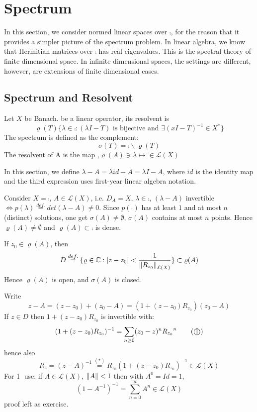 \newpage

\section{Spectrum}
In this section, we consider normed linear spaces over $\comp$, for the reason that it provides a simpler picture of the spectrum problem. In linear algebra, we know that Hermitian matrices over $\comp$ has real eigenvalues. This is the spectral theory of finite dimensional space. In infinite dimensional spaces, the settings are different, however, are extensions of finite dimensional cases.
\subsection{Spectrum and Resolvent}
\begin{definition}\nl
	Let $X$ be Banach.  be a linear operator, its resolvent is
	$$
		\varrho({T})
		\{
		\lambda\in\comp:(\lambda I-T) \text{ is bijective and } \exists (xI-T)^{-1}\in X^*
		\}
	$$
	The spectrum is defined as the complement:
	$$
		\sigma(T)=\comp\backslash\varrho(T)
	$$
	The {\underline{resolvent}} of A is the map ,$\varrho(A)\ni\lambda\mapsto \in\mathcal{L}(X)$
\end{definition}

\begin{remark}\nl
	In this section, we define $\lambda-A=\lambda id -A=\lambda I-A$, where $id$ is the identity map and the third expression uses first-year linear algebra notation.
\end{remark}

\begin{example}
	Consider $X=\comp$, $A\in \mathcal{L}(X)$, i.e. $D_A=X$, $\lambda\in\comp$, $(\lambda-A)$ invertible $\iff p(\lambda)\stackrel{def.}{=}det(\lambda-A)\neq0$. Since  $p(\cdot)$ has at least $1$ and at most $n$ (distinct) solutions, one get $\sigma(A)\neq \emptyset$, $\sigma(A)$ contains at most $n$ points. Hence $\varrho(A)\neq\emptyset$ and $\varrho(A)\subset\comp$ is dense.
\end{example}

\begin{lemma}\nl
	If $z_0\in\varrho(A)$, then
	$$D\stackrel{def.}{=}
		\{
		\varrho\in\mathbb{C}:|z-z_0|<\frac{1}{\left\|{R_{z_0}}\right\|_{\mathcal{L}(X)}}
		\}
		\subset\varrho(A)$$
	Hence $\varrho(A)$ is open, and $\sigma(A)$ is closed.
	\begin{pf}{}{}
		Write 
		$$
		z-A=
		( z-z_0)+(z_0-A)=(1+(z-z_0)R_{z_0})(z_0-A)
		$$
		If $z\in D$ then $1+(z-z_0)R_{z_0}$ is invertible with:
		\[
		(1+(z-z_0)R_{z_0})^{-1}=\sum_{n\geq0}(z_0-z)^n {R_{z_0}}^n\tag{\textcircled{1}}
		\]
		hence also
		$$
		R_z=(z-A)^{-1}\stackrel{(*)}{=}R_{z_0}(1+(z-z_0)R_{z_0})^{-1}\in\mathcal{L}(X)
		$$
		For \textcircled{1} use: if $A\in\mathcal{L}(X)$, $\left\|{A}\right\|<1$ then with $A^0=Id=1$,
		$$
		(1-A^{-1})^{-1}=\sum_{n=0}^\infty A^n\in\mathcal{L}(X)
		$$
		proof left as exercise.
	\end{pf}
\end{lemma}

